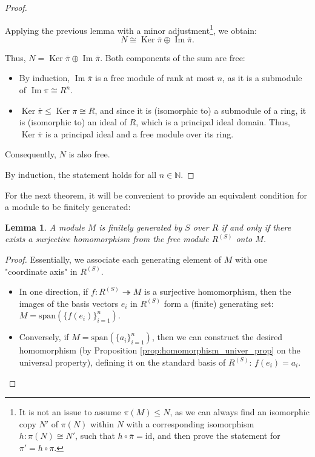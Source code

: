\documentclass{article}
\newif\ifusemulticols
\theoremstyle{definition}
\theoremstyle{remark}
\theoremstyle{plain}
\theoremstyle{plain}
\newtheorem{lemma}[theorem]{Lemma}
\newenvironment{mymulticols}
    { \ifusemulticols \begin{multicols}{2} \fi }
    { \ifusemulticols \end{multicols} \fi }
\DeclareMathOperator{\Ker}{Ker}
\DeclareMathOperator{\image}{Im}
\newcommand{\N}{\mathbb{N}}
\begin{document}
\begin{mymulticols}
\begin{proof}
\begin{enumerate}
            Applying the previous lemma with a minor adjustment\footnote{It is not an issue to
            assume $\pi(M) \le N$, as we can always find an isomorphic copy $N'$ of $\pi(N)$ within
            $N$ with a corresponding isomorphism $h : \pi(N) \cong N'$, such that $h \circ
            \overline{\pi} = \text{id}$, and then prove the statement for $\pi' = h \circ \pi$.}, we
            obtain: $$N \cong \Ker \overline{\pi} \oplus \image \overline{\pi}.$$

            Thus, $N = \Ker \overline{\pi} \oplus \image \overline{\pi}$. Both components of the sum are free:
            \begin{itemize}
                \item By induction, $\image \overline{\pi}$ is a free module of rank at most $n$, as
                    it is a submodule of $\image \pi \cong R^n$.
                \item $\Ker \overline{\pi} \le \Ker \pi \cong R$, and since it is (isomorphic to) a
                    submodule of a ring, it is (isomorphic to) an ideal of $R$, which is a principal
                    ideal domain. Thus, $\Ker \overline{\pi}$ is a principal ideal and a free module
                    over its ring.
            \end{itemize}
        Consequently, $N$ is also free.
    \end{enumerate}
    By induction, the statement holds for all $n \in \N$.
\end{proof}

For the next theorem, it will be convenient to provide an equivalent condition for a module to be
finitely generated:

\begin{lemma}
    A module $M$ is finitely generated by $S$ over $R$ if and only if there exists a surjective
    homomorphism from the free module $R^{(S)}$ onto $M$.
\end{lemma}
\begin{proof}
    Essentially, we associate each generating element of $M$ with one "coordinate axis" in
    $R^{(S)}$.

    \begin{itemize}
        \item In one direction, if $f : R^{(S)} \twoheadrightarrow M$ is a surjective homomorphism,
            then the images of the basis vectors $e_i$ in $R^{(S)}$ form a (finite) generating set: $M = \text{span}(\{f(e_i)\}_{i=1}^n)$.

        \item Conversely, if $M = \text{span}(\{a_i\}_{i=1}^n)$, then we can construct the desired
            homomorphism (by Proposition \ref{prop:homomorphism_univer_prop} on the universal
            property), defining it on the standard basis of $R^{(S)}$: $f(e_i) = a_i$.


\end{itemize}
\end{proof}
\end{mymulticols}
\end{document}
